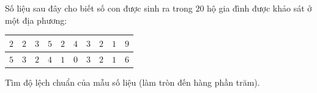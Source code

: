 \begin{ex}
Số liệu sau đây cho biết số con được sinh ra trong $20$ hộ gia đình được khảo sát ở một địa phương:
\begin{center}
\begin{tabular}{|c|c|c|c|c|c|c|c|c|c|}\hline
$2$ & $2$ & $3$ & $5$ & $2$ & $4$ & $3$ & $2$ & $1$ & $9$\\\hline
$5$ & $3$ & $2$ & $4$ & $1$ & $0$ & $3$ & $2$ & $1$ & $6$\\\hline
\end{tabular}
\end{center}
Tìm độ lệch chuẩn của mẫu số liệu (làm tròn đến hàng phần trăm).
\end{ex}
